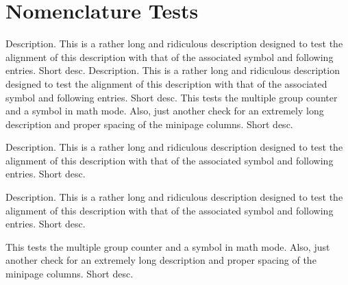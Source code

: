 
\chapter{Nomenclature Tests}

\MakeNomenclatureNotStarred

\begin{Nomenclature}[section]
      {Description. This is a rather long and ridiculous description designed to test the alignment of 
                 this description with that of the associated symbol and following entries.}
        {Short desc.}   
            {Description. This is a rather long and ridiculous description designed to test the alignment of 
             this description with that of the associated symbol and following entries.}
            {Short desc.}
            {This tests the multiple group counter and a symbol in math mode.  Also, just another check
             for an extremely long description and proper spacing of the minipage columns.}
            {Short desc.}
        
\end{Nomenclature}



\MakeNomenclatureStarred
{}
\begin{Nomenclature}[section]
      {Description. This is a rather long and ridiculous description designed to test the alignment of 
                 this description with that of the associated symbol and following entries.}
        {Short desc.}   
    
            {Description. This is a rather long and ridiculous description designed to test the alignment of 
             this description with that of the associated symbol and following entries.}
            {Short desc.}

    \MakeNomenclatureNotStarred
            {This tests the multiple group counter and a symbol in math mode.  Also, just another check
             for an extremely long description and proper spacing of the minipage columns.}
            {Short desc.}

\end{Nomenclature}

